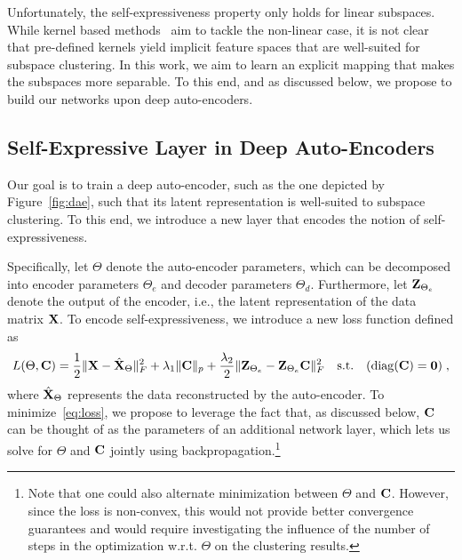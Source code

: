 \documentclass{article}
\begin{document}
Unfortunately, the self-expressiveness property only holds for linear subspaces. While kernel based methods~\cite{patel2013latent, patel2014kernel,yin2016kernel,xiao2016robust} aim to tackle the non-linear case, it is not clear that pre-defined kernels yield implicit feature spaces that are well-suited for subspace clustering.
In this work, we aim to learn an explicit mapping 
that makes the subspaces more separable. To this end, and as discussed below, we propose to build our networks upon deep auto-encoders.

\subsection{Self-Expressive Layer in Deep Auto-Encoders}

Our goal is to train a deep auto-encoder, such as the one depicted by  Figure~\ref{fig:dae}, such that its latent representation is well-suited to subspace clustering. To this end, we introduce a new layer that encodes the notion of self-expressiveness. 

Specifically, let $\Theta$ denote the auto-encoder parameters, which can be decomposed into encoder parameters $\Theta_e$ and decoder parameters $\Theta_d$. Furthermore, let ${\bf Z}_{\Theta_e}$ denote the output of the encoder, i.e., the latent representation of the data matrix ${\bf X}$. To encode self-expressiveness, we introduce a new loss function defined as
\begin{equation}
\label{eq:loss}
L(\Theta, {\bf C}) = \frac{1}{2}\|{\bf X} - \hat{\bf X}_{\Theta}\|_F^2 + \lambda_1 \|{\bf C}\|_p + \frac{\lambda_2}{2}\|{\bf Z}_{\Theta_e} - {\bf Z}_{\Theta_e}{\bf C}\|_F^2\quad {\rm s.t.}\quad  ({\rm diag}({\bf C}) = {\bf 0})\;,
\end{equation}
where $\hat{\bf X}_{\Theta}$ represents the data reconstructed by the auto-encoder. To minimize~\eqref{eq:loss}, we propose to leverage the fact that, as discussed below, ${\bf C}$ can be thought of as the parameters of an additional network layer, which lets us solve for $\Theta$ and ${\bf C}$ jointly using backpropagation.\footnote{Note that one could also alternate minimization between $\Theta$ and ${\bf C}$. However, since the loss is non-convex, this would not provide better convergence guarantees and would require investigating the influence of the number of steps in the optimization w.r.t. $\Theta$ on the clustering results.} 
\end{document}
